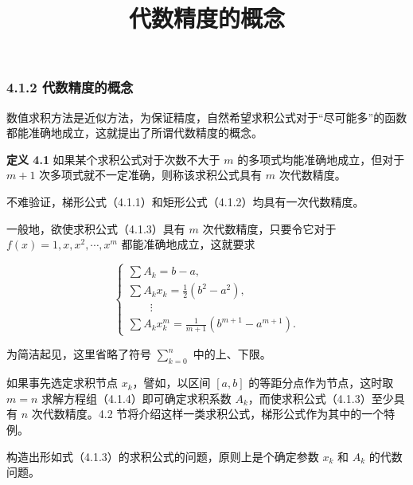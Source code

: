 \documentclass[
  10pt,
  fontset=fandol]{ctexart}
\title{代数精度的概念}
\author{}
\date{}
\begin{document}
\maketitle

\subsubsection{4.1.2 代数精度的概念}\label{ux4ee3ux6570ux7cbeux5ea6ux7684ux6982ux5ff5}

数值求积方法是近似方法，为保证精度，自然希望求积公式对于``尽可能多''的函数都能准确地成立，这就提出了所谓代数精度的概念。

\textbf{定义 4.1} 如果某个求积公式对于次数不大于 \(m\) 的多项式均能准确地成立，但对于 \(m+1\) 次多项式就不一定准确，则称该求积公式具有 \(m\) 次代数精度。

不难验证，梯形公式（4.1.1）和矩形公式（4.1.2）均具有一次代数精度。

一般地，欲使求积公式（4.1.3）具有 \(m\) 次代数精度，只要令它对于 \(f(x)=1,x,x^2,\cdots,x^m\) 都能准确地成立，这就要求

\[
\begin{cases}
\displaystyle\sum A_k=b-a,\\[4pt]
\displaystyle\sum A_kx_k=\frac12(b^2-a^2),\\
\qquad\vdots\\
\displaystyle\sum A_kx_k^m=\frac{1}{m+1}(b^{m+1}-a^{m+1}).
\end{cases}
\tag{4.1.4}
\]

为简洁起见，这里省略了符号 \(\displaystyle\sum_{k=0}^n\) 中的上、下限。

如果事先选定求积节点 \(x_k\)，譬如，以区间 \([a,b]\) 的等距分点作为节点，这时取 \(m=n\) 求解方程组（4.1.4）即可确定求积系数 \(A_k\)，而使求积公式（4.1.3）至少具有 \(n\) 次代数精度。4.2 节将介绍这样一类求积公式，梯形公式作为其中的一个特例。

构造出形如式（4.1.3）的求积公式的问题，原则上是个确定参数 \(x_k\) 和 \(A_k\) 的代数问题。
\end{document}
